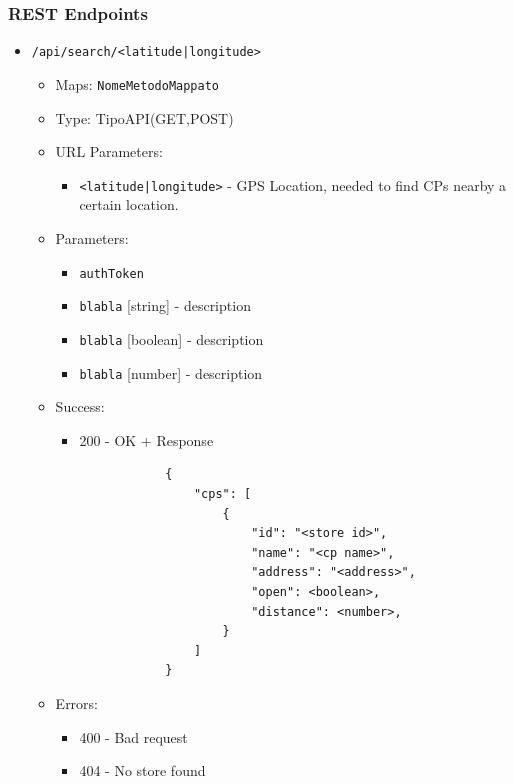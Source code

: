 \subsubsection{REST Endpoints}
\renewcommand{\labelitemii}{}
\renewcommand{\labelitemiii}{-}
\begin{itemize}
    \item \texttt{/api/search/<latitude|longitude>}
          \begin{itemize}
              \item Maps: \texttt{NomeMetodoMappato}
              \item Type: TipoAPI(GET,POST)
              \item URL Parameters:
                    \begin{itemize}
                        \item \texttt{<latitude|longitude>} - GPS Location, needed to find CPs nearby a certain location.
                    \end{itemize}
              \item Parameters:
                    \begin{itemize}
                        \item \texttt{authToken}
                        \item \texttt{blabla} [string] - description
                        \item \texttt{blabla} [boolean] - description
                        \item \texttt{blabla} [number] - description
                    \end{itemize}
              \item Success:
                    \begin{itemize}
                        \item 200 - OK + Response
                              \begin{lstlisting}
            {
                "cps": [
                    {
                        "id": "<store id>",
                        "name": "<cp name>",
                        "address": "<address>",
                        "open": <boolean>,
                        "distance": <number>,
                    }
                ]
            }
            \end{lstlisting}
                    \end{itemize}
              \item Errors:
                    \begin{itemize}
                        \item 400 - Bad request
                        \item 404 - No store found
                    \end{itemize}
          \end{itemize}
\end{itemize}

